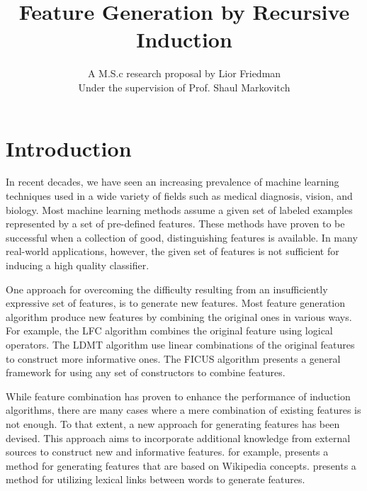 \documentclass[12pt, a4paper]{article}
\theoremstyle{definition}
\begin{document}
\title{
	{
	Feature Generation by Recursive Induction%
	}\\
}
\author{
    {A M.S.c research proposal by Lior Friedman}\\
    {Under the supervision of Prof. Shaul Markovitch}
}

\maketitle

\section{Introduction}
\label{sec:Intro}
In recent decades, we have seen an increasing prevalence of machine learning techniques used in a wide variety of fields such as medical diagnosis, vision, and biology.
Most machine learning methods assume a given set of labeled examples represented by a set of
pre-defined features. These methods have proven to be successful when a collection of good,
distinguishing features is available.
In many real-world applications, however, the given set of features is not sufficient for inducing a high quality classifier.

One approach for overcoming the difficulty resulting from an insufficiently expressive set of features, is to generate new features.  Most feature generation algorithm produce new features by combining the original ones in various ways.  For example, the LFC algorithm \citep{ragavan1993complex} combines the original feature using logical operators.  The LDMT algorithm \citep{utgo1991linear} use linear combinations of the original features to construct more informative ones.  The FICUS algorithm \citep{markovitch2002feature} presents a general framework for using any set of constructors to combine features.

While feature combination has proven to enhance the performance of induction algorithms, there are many cases where a mere combination of existing features is not enough.  To that extent, a new approach for generating features has been devised.  This approach aims to incorporate additional knowledge from external sources to construct new and informative features.
\citet{gabrilovich2007computing} for example, presents a method for generating features that are based on Wikipedia concepts.  \citet{jarmasz2004roget} presents a method for utilizing lexical links between words to generate features.
\end{document}

